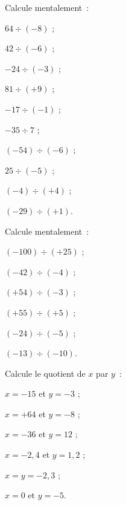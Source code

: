 \begin{exercice}
Calcule mentalement :
\begin{colenumerate}{2}
 \item $64 \div (-8)$ ;
 \item $42 \div (-6)$ ;
 \item $-24 \div (-3)$ ;
 \item $81 \div (+9)$ ;
 \item $-17 \div (-1)$ ;
 \item $-35 \div 7$ ;
 \item $(-54) \div (-6)$ ;
 \item $25 \div (-5)$ ;
 \item $(-4) \div (+4)$ ;
 \item $(-29) \div (+1)$.
 \end{colenumerate}
\end{exercice}


\begin{exercice}
Calcule mentalement :
\begin{colenumerate}{2}
 \item $(-100) \div (+25)$ ;
 \item $(-42) \div (-4)$ ;
 \item $(+54) \div (-3)$ ;
 \item $(+55) \div (+5)$ ;
 \item $(-24) \div (-5)$ ;
 \item $(-13)  \div (-10)$.
 \end{colenumerate}
\end{exercice}


\begin{exercice}
Calcule le quotient de $x$ par $y$ :
\begin{colenumerate}{2}
 \item $x = -15$ et $y = -3$ ;
 \item $x = +64$ et $y = -8$ ;
 \item $x = -36$ et $y = 12$ ;
 \item $x = -2,4$ et $y = 1,2$ ;
 \item $x = y = -2,3$ ;
 \item $x = 0$ et $y = -5$.
 \end{colenumerate}
\end{exercice}


